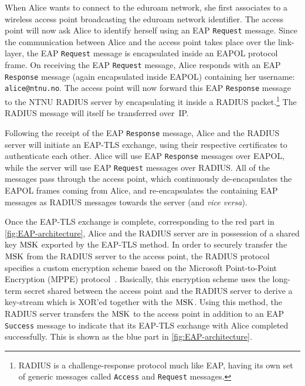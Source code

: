 \begin{example}
When Alice wants to connect to the eduroam network,
she first associates
to a wireless access point broadcasting the eduroam network identifier. 
The access point will now ask Alice to identify herself using an EAP \texttt{Request} message.
Since the communication between Alice and the access point takes place over the link-layer, 
the EAP \texttt{Request} message is encapsulated inside an EAPOL protocol frame. 
On receiving the EAP \texttt{Request} message,
Alice responds with an EAP \texttt{Response} message (again encapsulated inside EAPOL) containing her username: \texttt{alice@ntnu.no}.
The access point will now forward this EAP \texttt{Response} message to the NTNU RADIUS server by encapsulating it inside a RADIUS packet.\footnote{RADIUS is a challenge-response protocol much like EAP,
having its own set of generic messages called \texttt{Access} and \texttt{Request} messages.
}
The RADIUS message will itself be transferred over~IP.

Following the receipt of the EAP \texttt{Response} message, 
Alice and the RADIUS server will initiate an EAP-TLS exchange, 
using their respective certificates to authenticate each other.
Alice will use EAP \texttt{Response} messages over EAPOL,
while the server will use EAP \texttt{Request} messages  over RADIUS.
All of the messages pass through the access point,
which continuously de-encapsulates the EAPOL frames coming from Alice,
and re-encapsulates the containing EAP messages as RADIUS messages towards the server (and \emph{vice versa}). 

Once the EAP-TLS exchange is complete, 
corresponding to the red part in \cref{fig:EAP-architecture},
Alice and the RADIUS server are in possession of a shared key $\mathrm{MSK}$ exported by the EAP-TLS method.
In order to securely transfer the $\mathrm{MSK}$ from the RADIUS server to the access point,
the RADIUS protocol specifies a custom encryption scheme based on the Microsoft Point-to-Point Encryption (MPPE) protocol~\cite{IETF:RFC2548:MS-MPPE-RADIUS-attributes}. 
Basically, this encryption scheme uses the long-term secret shared between the access point and the RADIUS server to derive a key-stream which is XOR'ed together with the $\mathrm{MSK}$.
Using this method,
the RADIUS server transfers the $\mathrm{MSK}$ to the access point in addition to an EAP \texttt{Success} message to indicate that its EAP-TLS exchange with Alice completed successfully.
This is shown as the blue part in \cref{fig:EAP-architecture}.


\end{example}
